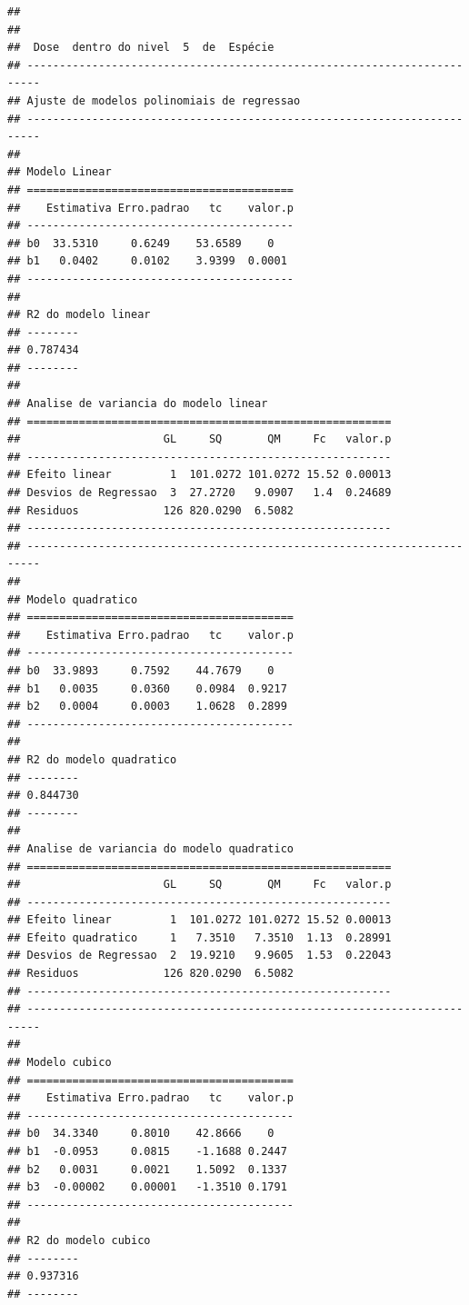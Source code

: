 \documentclass[
]{article}
\begin{document}
\begin{verbatim}
## 
## 
##  Dose  dentro do nivel  5  de  Espécie 
## ------------------------------------------------------------------------
## Ajuste de modelos polinomiais de regressao
## ------------------------------------------------------------------------
## 
## Modelo Linear
## =========================================
##    Estimativa Erro.padrao   tc    valor.p
## -----------------------------------------
## b0  33.5310     0.6249    53.6589    0   
## b1   0.0402     0.0102    3.9399  0.0001 
## -----------------------------------------
## 
## R2 do modelo linear
## --------
## 0.787434
## --------
## 
## Analise de variancia do modelo linear
## ========================================================
##                      GL     SQ       QM     Fc   valor.p
## --------------------------------------------------------
## Efeito linear         1  101.0272 101.0272 15.52 0.00013
## Desvios de Regressao  3  27.2720   9.0907   1.4  0.24689
## Residuos             126 820.0290  6.5082               
## --------------------------------------------------------
## ------------------------------------------------------------------------
## 
## Modelo quadratico
## =========================================
##    Estimativa Erro.padrao   tc    valor.p
## -----------------------------------------
## b0  33.9893     0.7592    44.7679    0   
## b1   0.0035     0.0360    0.0984  0.9217 
## b2   0.0004     0.0003    1.0628  0.2899 
## -----------------------------------------
## 
## R2 do modelo quadratico
## --------
## 0.844730
## --------
## 
## Analise de variancia do modelo quadratico
## ========================================================
##                      GL     SQ       QM     Fc   valor.p
## --------------------------------------------------------
## Efeito linear         1  101.0272 101.0272 15.52 0.00013
## Efeito quadratico     1   7.3510   7.3510  1.13  0.28991
## Desvios de Regressao  2  19.9210   9.9605  1.53  0.22043
## Residuos             126 820.0290  6.5082               
## --------------------------------------------------------
## ------------------------------------------------------------------------
## 
## Modelo cubico
## =========================================
##    Estimativa Erro.padrao   tc    valor.p
## -----------------------------------------
## b0  34.3340     0.8010    42.8666    0   
## b1  -0.0953     0.0815    -1.1688 0.2447 
## b2   0.0031     0.0021    1.5092  0.1337 
## b3  -0.00002    0.00001   -1.3510 0.1791 
## -----------------------------------------
## 
## R2 do modelo cubico
## --------
## 0.937316
## --------

\end{verbatim}
\end{document}
